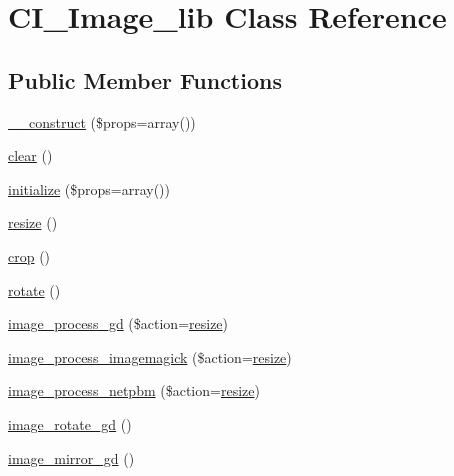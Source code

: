 \hypertarget{class_c_i___image__lib}{}\section{C\+I\+\_\+\+Image\+\_\+lib Class Reference}
\label{class_c_i___image__lib}
\subsection*{Public Member Functions}
\begin{DoxyCompactItemize}
\item 
\mbox{\hyperlink{class_c_i___image__lib_a563262d396a1cef6153c9998d77bb548}{\+\_\+\+\_\+construct}} (\$props=array())
\item 
\mbox{\hyperlink{class_c_i___image__lib_aa821bec12eaa7e0f649397c9675ff505}{clear}} ()
\item 
\mbox{\hyperlink{class_c_i___image__lib_a0bccf32e3d2d283de0521949330cb969}{initialize}} (\$props=array())
\item 
\mbox{\hyperlink{class_c_i___image__lib_a94e38a7d478ce07200a52c51497e598e}{resize}} ()
\item 
\mbox{\hyperlink{class_c_i___image__lib_a77248c0134d1b117eb36774ecee6e04c}{crop}} ()
\item 
\mbox{\hyperlink{class_c_i___image__lib_a74e94d71195d9cbb9c9e3bca3353d912}{rotate}} ()
\item 
\mbox{\hyperlink{class_c_i___image__lib_aa8ef6ef7b931a663dd906ce27236c6fd}{image\+\_\+process\+\_\+gd}} (\$action=\textquotesingle{}\mbox{\hyperlink{class_c_i___image__lib_a94e38a7d478ce07200a52c51497e598e}{resize}}\textquotesingle{})
\item 
\mbox{\hyperlink{class_c_i___image__lib_a141ec7c2c7cbe7a9a6a913d12fe973da}{image\+\_\+process\+\_\+imagemagick}} (\$action=\textquotesingle{}\mbox{\hyperlink{class_c_i___image__lib_a94e38a7d478ce07200a52c51497e598e}{resize}}\textquotesingle{})
\item 
\mbox{\hyperlink{class_c_i___image__lib_ab40d1235dccf0611ef4fe5a6b0272dd3}{image\+\_\+process\+\_\+netpbm}} (\$action=\textquotesingle{}\mbox{\hyperlink{class_c_i___image__lib_a94e38a7d478ce07200a52c51497e598e}{resize}}\textquotesingle{})
\item 
\mbox{\hyperlink{class_c_i___image__lib_ae0d52ef7503342a0a1c56c99da140446}{image\+\_\+rotate\+\_\+gd}} ()
\item 
\mbox{\hyperlink{class_c_i___image__lib_a3f6d47ec077726da699890d4644797ad}{image\+\_\+mirror\+\_\+gd}} ()

\end{DoxyCompactItemize}
